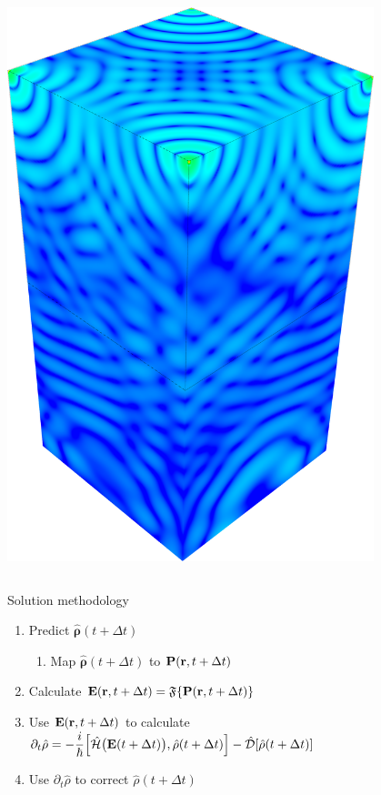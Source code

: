 \documentclass[aspectratio=169]{beamer}
\begin{document}
\begin{frame}
\begin{columns}
\begin{column}{0.3\textwidth}
      \includegraphics[width=0.8\textwidth]{figures/dipoles_2.png}
    \end{column}
  \end{columns}
\end{frame}

\begin{frame}{Solution methodology}
  \begin{enumerate}
    \item Predict $\hat{\mathbf{\rho}}(t + \Delta t)$
      \begin{enumerate}
        \item Map $\hat{\mathbf{\rho}}(t + \Delta t)$ to $\vb{P}(\vb{r}, t + \Delta t)$
      \end{enumerate}
    \item Calculate $\vb{E}(\vb{r}, t + \Delta t) = \mathfrak{F}\qty{\vb{P}(\vb{r}, t + \Delta t)}$
    \item Use $\displaystyle \vb{E}(\vb{r}, t + \Delta t)$ to calculate $\displaystyle \partial_t \hat{\rho} = -\frac{i}{\hbar} \commutator{\hat{\mathcal{H}}\qty\big(\vb{E}(t + \Delta t))}{\hat{\rho}(t + \Delta t)} - \hat{\mathcal{D}}\qty[\hat{\rho}(t + \Delta t)]$
    \item Use $\partial_t \hat{\rho}$ to correct $\hat{\rho}(t + \Delta t)$
  \end{enumerate}
\end{frame}
\end{document}
